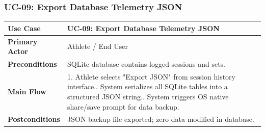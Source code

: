 \subsubsection{UC-09: Export Database Telemetry JSON}
\begin{table}[h!]
\centering
\small
\begin{tabularx}{\textwidth}{l X}
\toprule
\textbf{Use Case} & \textbf{UC-09: Export Database Telemetry JSON} \\
\midrule
\textbf{Primary Actor} & Athlete / End User \\
\textbf{Preconditions} & SQLite database contains logged sessions and sets. \\
\textbf{Main Flow} & 
1. Athlete selects "Export JSON" from session history interface.\newline
2. System serializes all SQLite tables into a structured JSON string.\newline
3. System triggers OS native share/save prompt for data backup. \\
\textbf{Postconditions} & JSON backup file exported; zero data modified in database. \\
\bottomrule
\end{tabularx}
\end{table}
